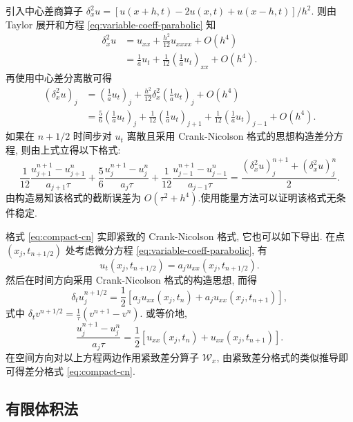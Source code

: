 引入中心差商算子 $\delta_x^2 u = [u(x+h, t) - 2u(x,t) + u(x-h, t)]/h^2$. 则由 Taylor 展开和方程 \eqref{eq:variable-coeff-parabolic} 知
\begin{align*}
    \delta_x^2 u &= u_{xx} + \frac{h^2}{12} u_{xxxx} + O(h^4) \\
    &= \frac{1}{a} u_t + \frac{1}{12} \left(\frac{1}{a} u_t\right)_{xx} + O(h^4).
\end{align*}
再使用中心差分离散可得
\begin{align*}
    (\delta_x^2 u)_j &= \left(\frac{1}{a} u_t\right)_j + \frac{h^2}{12} \delta_x^2 \left(\frac{1}{a} u_t\right)_j + O(h^4) \\
    &= \frac{5}{6} \left(\frac{1}{a} u_t\right)_j + \frac{1}{12} \left(\frac{1}{a} u_t\right)_{j+1} + \frac{1}{12} \left(\frac{1}{a} u_t\right)_{j-1} + O(h^4).
\end{align*}
如果在 $n+1/2$ 时间步对 $u_t$ 离散且采用 Crank-Nicolson 格式的思想构造差分方程, 则由上式立得以下格式:
\begin{equation}\label{eq:compact-cn}
    \frac{1}{12} \frac{u_{j+1}^{n+1} - u_{j+1}^n}{a_{j+1}\tau} + \frac{5}{6} \frac{u_j^{n+1} - u_j^n}{a_j\tau} + \frac{1}{12} \frac{u_{j-1}^{n+1} - u_{j-1}^n}{a_{j-1}\tau} = \frac{(\delta_x^2 u)_j^{n+1} + (\delta_x^2 u)_j^n}{2}.
\end{equation}
由构造易知该格式的截断误差为 $O(\tau^2 + h^4)$.使用能量方法可以证明该格式无条件稳定.\par
格式 \eqref{eq:compact-cn} 实即紧致的 Crank-Nicolson 格式, 它也可以如下导出. 在点 $(x_j, t_{n+1/2})$ 处考虑微分方程 \eqref{eq:variable-coeff-parabolic}, 有
\begin{equation*}
    u_t(x_j, t_{n+1/2}) = a_j u_{xx}(x_j, t_{n+1/2}).
\end{equation*}
然后在时间方向采用 Crank-Nicolson 格式的构造思想, 而得
\begin{equation*}
    \delta_t u_j^{n+1/2} = \frac{1}{2} [a_j u_{xx}(x_j, t_n) + a_j u_{xx}(x_j, t_{n+1})],
\end{equation*}
式中 $\delta_t v^{n+1/2} = \frac{1}{\tau}(v^{n+1} - v^n)$. 或等价地,
\begin{equation*}
    \frac{u_j^{n+1} - u_j^n}{a_j\tau} = \frac{1}{2} [u_{xx}(x_j, t_n) + u_{xx}(x_j, t_{n+1})].
\end{equation*}
在空间方向对以上方程两边作用紧致差分算子 $\mathcal{W}_x$, 由紧致差分格式的类似推导即可得差分格式 \eqref{eq:compact-cn}.

\subsection{有限体积法}

